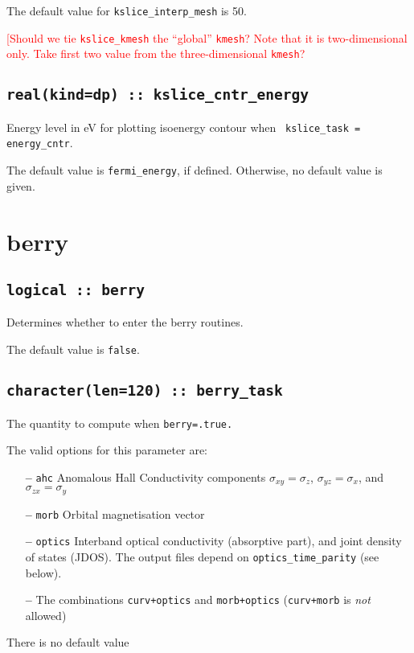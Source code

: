 The default value for \verb#kslice_interp_mesh# is 50.

\textcolor{red}{{[Should we tie {\tt kslice\_kmesh} the ``global''
{\tt kmesh}? Note that it is two-dimensional only. Take first
two value from the three-dimensional {\tt kmesh}?}}


\subsection[kslice\_cntr\_energy]{\tt real(kind=dp) :: kslice\_cntr\_energy}

Energy level in eV for plotting isoenergy contour when {\tt
  kslice\_task = energy\_cntr}.

The default value is {\tt fermi\_energy}, if defined. Otherwise, no
default value is given.

\clearpage
\section{berry}

\subsection[berry]{\tt logical :: berry}
Determines whether to enter the berry routines.

The default value is \verb#false#.


\subsection[berry\_task]{\tt character(len=120) ::  berry\_task}
The quantity to compute when {\tt berry=.true.}

The valid options for this parameter are:
\begin{itemize}
\item[{\bf --}] \verb#ahc# Anomalous Hall Conductivity components
  $\sigma_{xy}=\sigma_z$, $\sigma_{yz}=\sigma_x$, and
  $\sigma_{zx}=\sigma_y$
\item[{\bf --}]  \verb#morb# Orbital magnetisation vector

\item[{\bf --}] \verb#optics# Interband optical conductivity
  (absorptive part), and joint density of states (JDOS).  The output
  files depend on {\tt optics\_time\_parity} (see below).

\item[{\bf --}] The combinations {\tt curv+optics} and {\tt morb+optics}
({\tt curv+morb} is {\it not} allowed)

\end{itemize}
There is no default value


